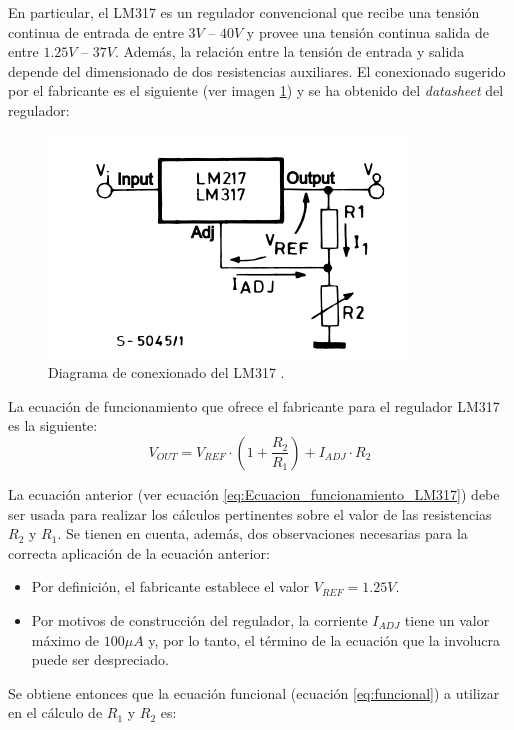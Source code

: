 En particular, el LM317 es un regulador convencional que recibe una tensión continua de entrada de entre $3V$ -- $40V$ y provee una tensión continua salida de entre $1.25V$ -- $37V$. Además, la relación entre la tensión de entrada y salida depende del dimensionado de dos resistencias auxiliares. El conexionado sugerido por el fabricante es el siguiente (ver imagen \ref{fig:LM317_Conexionado}) y se ha obtenido del \textit{datasheet} del regulador:

\begin{figure}[H]
    \centering 
    \includegraphics[width=.6\linewidth]{pictures/LM317 conexionado.PNG}
    \caption{Diagrama de conexionado del LM317 \cite{noauthor_lm317_nodate}.}
    \label{fig:LM317_Conexionado}
\end{figure}

La ecuación de funcionamiento que ofrece el fabricante para el regulador LM317 es la siguiente:
\begin{equation}
    V_{OUT} = V_{REF} \cdot \left( 1 + \frac{R_2}{R_1}\right) + I_{ADJ} \cdot R_2
    \label{eq:Ecuacion_funcionamiento_LM317}
\end{equation}

La ecuación anterior (ver ecuación \ref{eq:Ecuacion_funcionamiento_LM317}) debe ser usada para realizar los cálculos pertinentes sobre el valor de las resistencias $R_2$ y $R_1$. Se tienen en cuenta, además, dos observaciones necesarias para la correcta aplicación de la ecuación anterior:
\begin{itemize}
    \item Por definición, el fabricante establece el valor $V_{REF} = 1.25V$.
    \item Por motivos de construcción del regulador, la corriente $I_{ADJ}$ tiene un valor máximo de $100 \mu A$ y, por lo tanto, el término de la ecuación que la involucra puede ser despreciado.
\end{itemize}

Se obtiene entonces que la ecuación funcional (ecuación \ref{eq:funcional}) a utilizar en el cálculo de $R_1$ y $R_2$ es:

